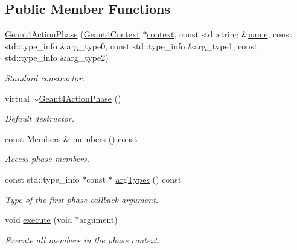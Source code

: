 \subsection*{Public Member Functions}
\begin{DoxyCompactItemize}
\item 
\hyperlink{class_d_d4hep_1_1_simulation_1_1_geant4_action_phase_a95448127c1419ea43e3902d1fe785dbe}{Geant4\+Action\+Phase} (\hyperlink{class_d_d4hep_1_1_simulation_1_1_geant4_context}{Geant4\+Context} $\ast$\hyperlink{class_d_d4hep_1_1_simulation_1_1_geant4_action_aa9d87f0ec2a72b7fc2591b18f98d75cf}{context}, const std\+::string \&\hyperlink{class_d_d4hep_1_1_simulation_1_1_geant4_action_af374e70b014d16afb81dd9d77cc3894b}{name}, const std\+::type\+\_\+info \&arg\+\_\+type0, const std\+::type\+\_\+info \&arg\+\_\+type1, const std\+::type\+\_\+info \&arg\+\_\+type2)
\begin{DoxyCompactList}\small\item\em Standard constructor. \end{DoxyCompactList}\item 
virtual \hyperlink{class_d_d4hep_1_1_simulation_1_1_geant4_action_phase_ae2d320d1dd7f433b5defb6f4fed5d757}{$\sim$\+Geant4\+Action\+Phase} ()
\begin{DoxyCompactList}\small\item\em Default destructor. \end{DoxyCompactList}\item 
const \hyperlink{class_d_d4hep_1_1_simulation_1_1_geant4_action_phase_a4df9a501a5c2d810603cd58f5ff5157d}{Members} \& \hyperlink{class_d_d4hep_1_1_simulation_1_1_geant4_action_phase_ada9ed3ec6ec673c9df6e41e116a7ddfa}{members} () const
\begin{DoxyCompactList}\small\item\em Access phase members. \end{DoxyCompactList}\item 
const std\+::type\+\_\+info $\ast$const  $\ast$ \hyperlink{class_d_d4hep_1_1_simulation_1_1_geant4_action_phase_a0c21acba218dc65cfa387dd4f14ceb4d}{arg\+Types} () const
\begin{DoxyCompactList}\small\item\em Type of the first phase callback-\/argument. \end{DoxyCompactList}\item 
void \hyperlink{class_d_d4hep_1_1_simulation_1_1_geant4_action_phase_a69f90116c5b2b689cf25e88e0a9f90e7}{execute} (void $\ast$argument)
\begin{DoxyCompactList}\small\item\em Execute all members in the phase context. \end{DoxyCompactList}\item 

\end{DoxyCompactItemize}
